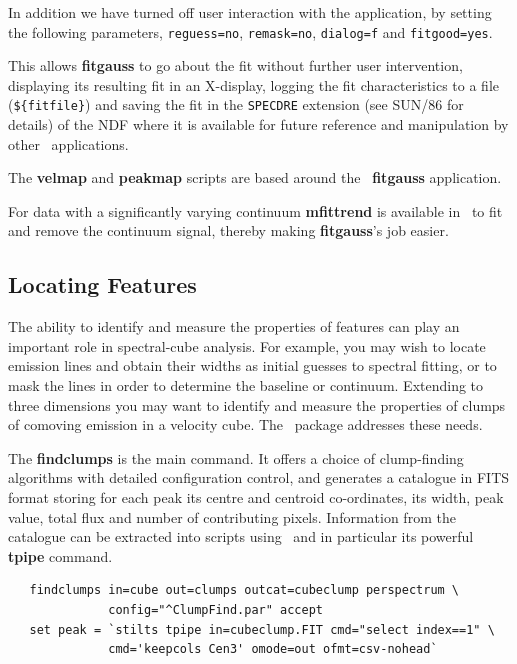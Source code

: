 \documentclass[twoside,11pt]{article}
\newcommand{\htmlref}[2]{#1}
\newcommand{\latex}[1]{#1}
\newcommand{\xref}[3]{#1}
\newcommand{\xlabel}[1]{}
\begin{document}
{In addition we have turned off user interaction with the application,
by setting the following parameters, \verb+reguess=no+,
\verb+remask=no+, \verb+dialog=f+ and \verb+fitgood=yes+.

This allows {\bf fitgauss} to go about the fit without further user
intervention, displaying its resulting fit in an X-display, logging
the fit characteristics to a file (\verb+${fitfile}+) and saving the
fit in the \xref{{\tt SPECDRE} extension}{sun86}{extension}
\latex{(see SUN/86 for details)} of the NDF where it is available
for future reference and manipulation by other \SPECDRE\ applications.

The \xref{{\bf velmap}}{sun237}{velmap} and \xref{{\bf
peakmap}}{sun237}{peakmap} scripts are based around the \SPECDRE\
{\bf fitgauss} application.

For data with a significantly varying continuum \xref{{\bf
mfittrend}}{sun95}{MFITTREND} is available in \KAPPA\ to fit and
remove the continuum signal, thereby making {\bf fitgauss}'s job easier.

\subsection{\label{sc16_features}Locating Features\xlabel{sc16_features}}

The ability to identify and measure the properties of features can
play an important role in spectral-cube analysis.  For example, you
may wish to locate emission lines and obtain their widths as initial
guesses to \htmlref{spectral fitting}{spectral_fitting}, or to mask
the lines in order to determine the baseline or continuum.  Extending
to three dimensions you may want to identify and measure the
properties of clumps of comoving emission in a velocity cube.
The \CUPIDref\ package addresses these needs.

The \xref{{\bf findclumps}}{sun255}{FINDCLUMPS} is the main command.
It offers a choice of clump-finding algorithms with detailed
configuration control, and generates a catalogue in FITS format
storing for each peak its centre and centroid co-ordinates, its width,
peak value, total flux and number of contributing pixels.  Information
from the catalogue can be extracted into scripts using \STILTSref\ and 
in particular its powerful \xref{{\bf tpipe}}{sun256}{} command.

\begin{verbatim}
   findclumps in=cube out=clumps outcat=cubeclump perspectrum \
              config="^ClumpFind.par" accept
   set peak = `stilts tpipe in=cubeclump.FIT cmd="select index==1" \
              cmd='keepcols Cen3' omode=out ofmt=csv-nohead`
\end{verbatim}

}
\end{document}
